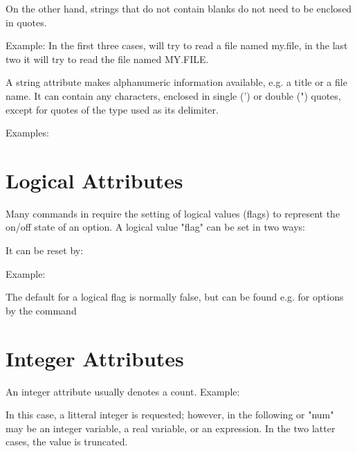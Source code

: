 On the other hand, strings that do not contain blanks do not
need to be enclosed in quotes.

Example:
In the first three cases, \madx will try to read a file named my.file, in the
last two it will try to read the file named MY.FILE.  



A string attribute makes alphanumeric information available, e.g. a
title or a file name. It can contain any characters, enclosed in single
(') or double (") quotes, except for quotes of the type used as its
delimiter.  

Examples: 


\section{Logical Attributes}
\label{sec:logical}
Many commands in \madx require the setting of logical values (flags) to
represent the on/off state of an option. A logical value "flag" can be
set in two ways:  

It can be reset by: 

Example: 

The default for a logical flag is normally false, but can be found e.g. for options by the command  


\section{Integer Attributes}
\label{sec:integer}
An integer attribute usually denotes a count. Example: 

In this case, a litteral integer is requested; however, in the following 
or 
"num" may be an integer variable, a real variable, or an expression.  In
the two latter cases, the value is truncated. 


